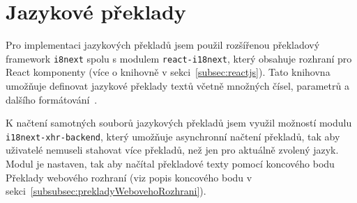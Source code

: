 
\section{Jazykové překlady}\label{sec:jazykovéPřeklady}

Pro implementaci jazykových překladů jsem použil rozšířenou překladový framework \texttt{i8next} spolu s modulem \texttt{react-i18next}, který obsahuje rozhraní pro React komponenty (více o knihovně v sekci~\ref{subsec:reactjs}).
Tato knihovna umožňuje definovat jazykové překlady textů včetně množných čísel, parametrů a dalšího formátování~\cite{i8next:docs}.

K načtení samotných souborů jazykových překladů jsem využil možností modulu \texttt{i18next-xhr-backend}, který umožňuje asynchronní načtení překladů, tak aby uživatelé nemuseli stahovat více překladů, než jen pro aktuálně zvolený jazyk.
Modul je nastaven, tak aby načítal překladové texty pomocí koncového bodu Překlady webového rozhraní (viz popis koncového bodu v sekci~\ref{subsubsec:prekladyWebovehoRozhrani}).
